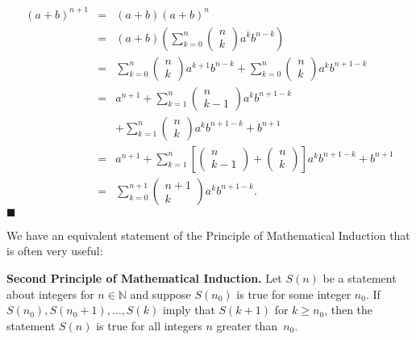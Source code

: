 \begin{eqnarray*}
(a + b)^{n + 1}
&  = &
(a + b)(a + b)^n \\
& = &
(a + b) 
\left(
\sum_{k = 0}^{n} \left( \begin{array}{c} n \\ k \end{array} \right) a^k b^{n - k}
\right) \\
&  = &
\sum_{k = 0}^{n} \left( \begin{array}{c} n \\ k
\end{array} \right) a^{k + 1} b^{n - k}   +
\sum_{k = 0}^{n} \left( \begin{array}{c} n \\ k
\end{array} \right) a^k b^{n + 1 - k} \\
&  = &
a^{n + 1} + \sum_{k = 1}^{n} \left( \begin{array}{c} n \\ k - 1
\end{array} \right) a^{k} b^{n + 1 - k} \\
&  & +
\sum_{k = 1}^{n} \left( \begin{array}{c} n \\ k
\end{array} \right) a^k b^{n + 1 - k} + b^{n + 1}\\
&  = &
a^{n + 1} + \sum_{k = 1}^{n} \left[ \left( \begin{array}{c} n \\
k - 1 \end{array} \right)
+
\left( \begin{array}{c} n \\ k \end{array} \right) \right]
a^k b^{n + 1 - k} + b^{n + 1} \\
&  = &
\sum_{k = 0}^{n + 1}   \left( \begin{array}{c} n + 1 \\ k
\end{array} \right) a^k b^{n + 1- k}.
\end{eqnarray*}
\hspace{\fill} $\blacksquare$

\medskip
 
We have an equivalent statement of the Principle of Mathematical Induction that is often very useful:
 
\medskip

\noindent 
{\bf Second Principle of Mathematical Induction.}  
Let $S(n)$ be a statement about integers for  $n \in {\mathbb N}$ and suppose $S(n_0)$ is true for some integer $n_0$.  If $S(n_0), S(n_0 + 1), \ldots, S(k)$ imply that $S(k + 1)$ for $k \geq n_0$, then the statement $S(n)$ is true for all integers $n$ greater than~$n_0$.   
 
